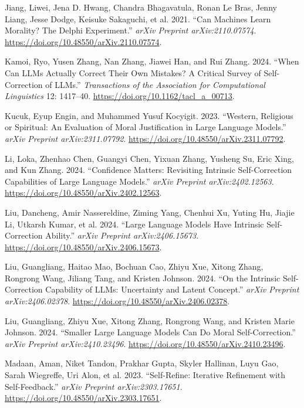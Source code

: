 \documentclass[
]{article}
\newlength{\cslhangindent}
\newenvironment{CSLReferences}[2] %
 {\begin{list}{}{%
  \setlength{\itemindent}{0pt}
  \setlength{\leftmargin}{0pt}
  \setlength{\parsep}{0pt}
  \ifodd #1
   \setlength{\leftmargin}{\cslhangindent}
   \setlength{\itemindent}{-1\cslhangindent}
  \fi
  \setlength{\itemsep}{#2\baselineskip}}}
 {\end{list}}
\begin{document}
\begin{CSLReferences}{1}{0}
Jiang, Liwei, Jena D. Hwang, Chandra Bhagavatula, Ronan Le Bras, Jenny
Liang, Jesse Dodge, Keisuke Sakaguchi, et al. 2021. {``Can Machines
Learn Morality? {T}he {D}elphi Experiment.''} \emph{arXiv Preprint
arXiv:2110.07574}. \url{https://doi.org/10.48550/arXiv.2110.07574}.

Kamoi, Ryo, Yusen Zhang, Nan Zhang, Jiawei Han, and Rui Zhang. 2024.
{``When Can {LLM}s Actually Correct Their Own Mistakes? A Critical
Survey of Self-Correction of {LLM}s.''} \emph{Transactions of the
Association for Computational Linguistics} 12: 1417--40.
\url{https://doi.org/10.1162/tacl_a_00713}.

Kucuk, Eyup Engin, and Muhammed Yusuf Kocyigit. 2023. {``Western,
Religious or Spiritual: An Evaluation of Moral Justification in Large
Language Models.''} \emph{arXiv Preprint arXiv:2311.07792}.
\url{https://doi.org/10.48550/arXiv.2311.07792}.

Li, Loka, Zhenhao Chen, Guangyi Chen, Yixuan Zhang, Yusheng Su, Eric
Xing, and Kun Zhang. 2024. {``Confidence Matters: Revisiting Intrinsic
Self-Correction Capabilities of Large Language Models.''} \emph{arXiv
Preprint arXiv:2402.12563}.
\url{https://doi.org/10.48550/arXiv.2402.12563}.

Liu, Dancheng, Amir Nassereldine, Ziming Yang, Chenhui Xu, Yuting Hu,
Jiajie Li, Utkarsh Kumar, et al. 2024. {``Large Language Models Have
Intrinsic Self-Correction Ability.''} \emph{arXiv Preprint
arXiv:2406.15673}. \url{https://doi.org/10.48550/arXiv.2406.15673}.

Liu, Guangliang, Haitao Mao, Bochuan Cao, Zhiyu Xue, Xitong Zhang,
Rongrong Wang, Jiliang Tang, and Kristen Johnson. 2024. {``On the
Intrinsic Self-Correction Capability of {LLM}s: Uncertainty and Latent
Concept.''} \emph{arXiv Preprint arXiv:2406.02378}.
\url{https://doi.org/10.48550/arXiv.2406.02378}.

Liu, Guangliang, Zhiyu Xue, Xitong Zhang, Rongrong Wang, and Kristen
Marie Johnson. 2024. {``Smaller Large Language Models Can Do Moral
Self-Correction.''} \emph{arXiv Preprint arXiv:2410.23496}.
\url{https://doi.org/10.48550/arXiv.2410.23496}.

Madaan, Aman, Niket Tandon, Prakhar Gupta, Skyler Hallinan, Luyu Gao,
Sarah Wiegreffe, Uri Alon, et al. 2023. {``Self-Refine: Iterative
Refinement with Self-Feedback.''} \emph{arXiv Preprint
arXiv:2303.17651}. \url{https://doi.org/10.48550/arXiv.2303.17651}.


\end{CSLReferences}
\end{document}
